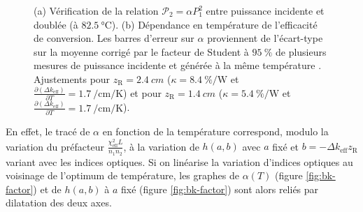 \documentclass[11pt,a4paper]{article}
\newcommand{\pdv}[2]{\frac{\partial #1}{\partial #2}}
\newcommand{\zr}{z_\mathsc{R}}
\newcommand{\chie}{\chi_\mathsc{eff}}
\newcommand{\dke}{\Delta k_\mathsc{eff}}
\renewcommand{\P}{\mathscr{P}}
\newcommand{\mathsc}[1]{\mathrm{\scriptscriptstyle {#1}}}
\begin{document}
\begin{figure}[htpb]
\centering
\hspace*{-0.4cm}\begin{subfigure}[b]{0.45\textwidth}
    \centering
    \small
    
    	\vspace{-1cm}
    \caption{}
    \label{fig:quadra}
\end{subfigure}
%
\hspace*{0.4cm}
\begin{subfigure}[b]{0.48\textwidth}
	\centering
	\small
	
	\vspace{-1cm}
	\caption{}
	\label{fig:alphabp}
\end{subfigure}
\caption[(a) Vérification de la relation $\P_2 = \alpha P_1^2$ entre puissance incidente et doublée (à $\SI{82.5}{\celsius}$). (b) Dépendance en température de l'efficacité de conversion.]{\small (a) Vérification de la relation $\P_2 = \alpha P_1^2$ entre puissance incidente et doublée (à $\SI{82.5}{\celsius}$).
(b) Dépendance en température de l'efficacité de conversion. Les barres d'erreur sur $\alpha$ proviennent de l'écart-type sur la moyenne corrigé par le facteur de Student à $\SI{95}{\percent}$ de plusieurs mesures de puissance incidente et générée à la même température \footnotemark .
Ajustements pour $\zr=\SI{2.4}{cm}$ ($\kappa=\SI{8.4}{\percent\per\watt}$ et $\pdv{\left(\dke\right)}{T}=\SI{1.7}{\per\centi\meter\per\kelvin}$) et pour $\zr=\SI{1.4}{cm}$ ($\kappa=\SI{5.4}{\percent\per\watt}$ et $\pdv{\left(\dke\right)}{T}=\SI{1.7}{\per\centi\meter\per\kelvin}$).
}
\end{figure}

En effet, le tracé de $\alpha$ en fonction de la température correspond, modulo la variation du préfacteur $\frac{\chie^2 L}{n_1 n_2}$, à la variation de $h(a,b)$ avec $a$ fixé et $b=-\Delta k_\mathsc{eff} \zr$ variant avec les indices optiques. Si on linéarise la variation d'indices optiques au voisinage de l'optimum de température, les graphes de $\alpha(T)$ (figure \ref{fig:bk-factor}) et de $h(a,b)$ à $a$ fixé (figure \ref{fig:bk-factor}) sont alors reliés par dilatation des deux axes.
\end{document}
